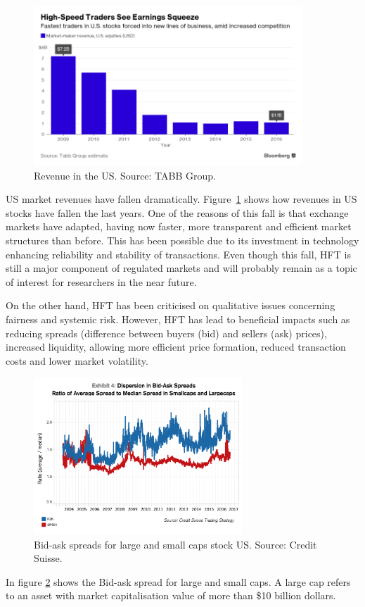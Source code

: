 \begin{figure}[!h]
  \centering
  \includegraphics[width=0.9\textwidth]{img/HFTmarket2.png}
  \caption[Revenue in the US]{Revenue in the US. Source: TABB Group.}
  \label{fig:HFTmarket2}
\end{figure}
US market revenues have fallen dramatically. Figure~\ref{fig:HFTmarket2} shows
how revenues in US stocks have fallen the last years. One of the reasons of this
fall is that exchange markets have adapted, having now faster, more transparent
and efficient market structures than before.  This has been possible due to its
investment in technology enhancing reliability and stability of transactions.
Even though this fall, HFT is still a major component of regulated markets and
will probably remain as a topic of interest for researchers in the near future.

On the other hand, HFT has been criticised on qualitative issues concerning
fairness and systemic risk. However, HFT has lead to beneficial impacts such as
reducing spreads (difference between buyers (bid) and sellers (ask) prices),
increased liquidity, allowing more efficient price formation, reduced
transaction costs and lower market volatility. 

\begin{figure}[!ht]
  \centering
  \includegraphics[width=0.7\textwidth]{img/bid-ask-spreads.jpg}
  \caption[Bid-ask spreads]{Bid-ask spreads for large and small caps stock US.
  Source: Credit Suisse.}
  \label{fig:Spreads}
\end{figure}
In figure \ref{fig:Spreads}  shows the Bid-ask spread for large and small caps.
A large cap refers to an asset with market capitalisation value of more than
\$10 billion dollars.

